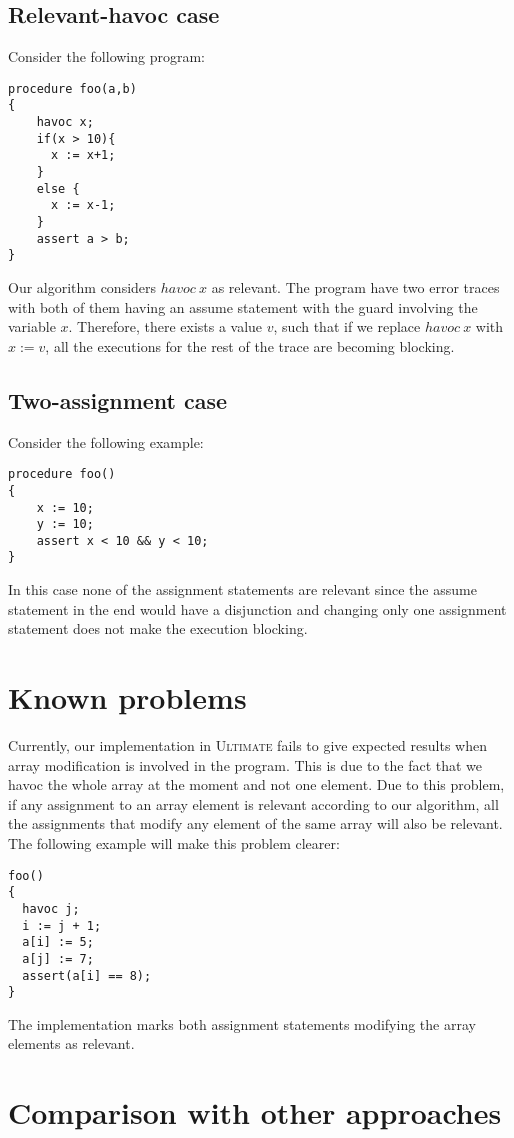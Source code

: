 \documentclass{article}
\newcommand{\ultimate}{\textsc{Ultimate}\xspace} %
\begin{document}
\subsection{Relevant-havoc case}
Consider the following program:
\begin{lstlisting}
procedure foo(a,b)
{
    havoc x;
    if(x > 10){
      x := x+1;
    }
    else {
      x := x-1;
    }
    assert a > b;
}
\end{lstlisting}
Our algorithm considers $havoc\ x$ as relevant. The program have two error traces with both of them having an assume statement with the guard involving the variable $x$. Therefore, there exists a value $v$, such that if we replace $havoc\ x$ with $x:=v$, all the executions for the rest of the trace are becoming blocking. 

\subsection{Two-assignment case}
Consider the following example:
\begin{lstlisting}
procedure foo()
{
    x := 10;
    y := 10;
    assert x < 10 && y < 10;
}
\end{lstlisting}
In this case none of the assignment statements are relevant since the assume statement in the end would have a disjunction and changing only one assignment statement does not make the execution blocking. 
\section{Known problems}
Currently, our implementation in \ultimate fails to give expected results when array modification is involved in the program. This is due to the fact that we havoc the whole array at the moment and not one element. Due to this problem, if any assignment to an array element is relevant according to our algorithm, all the assignments that modify any element of the same array will also be relevant. The following example will make this problem clearer:
\begin{lstlisting}
foo()
{ 
  havoc j;
  i := j + 1;
  a[i] := 5;
  a[j] := 7;
  assert(a[i] == 8);
}
\end{lstlisting}
The implementation marks both assignment statements modifying the array elements as relevant.

\section{Comparison with other approaches}
\end{document}
